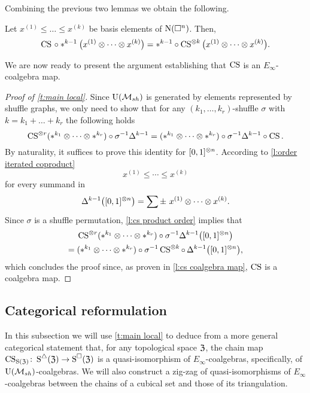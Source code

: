 Combining the previous two lemmas we obtain the following.

\begin{lemma} \label{l:cs product order}
	Let $x^{(1)} \leq \dots \leq x^{(k)}$ be basis elements of $\operatorname{N}(\square^n)$.
	Then,
	\[
	\operatorname{CS} \, \circ \ast^{k-1} \big( x^{(1)} \otimes \dotsb \otimes x^{(k)} \big)
	=
	\ast^{k-1} \circ \operatorname{CS}^{\otimes k} \big( x^{(1)} \otimes \dotsb \otimes x^{(k)} \big).
	\]
\end{lemma}

We are now ready to present the argument establishing that $\operatorname{CS}$ is an $E_\infty$-coalgebra map.

\begin{proof}[Proof of \cref{t:main local}]
	Since ${\operatorname{U}(\mathcal{M}_{sh})}$ is generated by elements represented by shuffle graphs, we only need to show that for any $(k_1,\dots,k_r)$-shuffle $\sigma$ with $k = k_1+\dots+k_r$ the following holds
	\[
	\operatorname{CS}^{\otimes r}(\ast^{k_1} \otimes \dotsb \otimes \ast^{k_r}) \circ \sigma^{-1} \Delta^{k-1} =
	(\ast^{k_1} \otimes \dotsb \otimes \ast^{k_r}) \circ \sigma^{-1} \Delta^{k-1} \circ \operatorname{CS}.
	\]
	By naturality, it suffices to prove this identity for $[0,1]^{\otimes n}$.
	According to \cref{l:order iterated coproduct}
	\[
	x^{(1)} \leq \cdots \leq x^{(k)}
	\]
	for every summand in
	\[
	\Delta^{k-1} \big([0,1]^{\otimes n}\big) =
	\sum \pm \ x^{(1)} \otimes \cdots \otimes x^{(k)}.
	\]
	Since $\sigma$ is a shuffle permutation, \cref{l:cs product order} implies that
	\begin{multline*}
		\operatorname{CS}^{\otimes r}(\ast^{k_1} \otimes \dotsb \otimes \ast^{k_r}) \circ \sigma^{-1} \Delta^{k-1} \big([0,1]^{\otimes n}\big) \\ =
		(\ast^{k_1} \otimes \dotsb \otimes \ast^{k_r}) \circ \sigma^{-1} \operatorname{CS}^{\otimes k} \circ \, \Delta^{k-1} \big([0,1]^{\otimes n}\big),
	\end{multline*}
	which concludes the proof since, as proven in \cref{l:cs coalgebra map}, $\operatorname{CS}$ is a coalgebra map.
\end{proof}

\subsection{Categorical reformulation}

In this subsection we will use \cref{t:main local} to deduce from a more general categorical statement that, for any topological space $\mathfrak{Z}$, the chain map $\operatorname{CS}_{\operatorname{S}(\mathfrak{Z})} \colon \operatorname{\operatorname{S}^{\triangle}}(\mathfrak{Z}) \to \operatorname{\operatorname{S}^{\square}}(\mathfrak{Z})$ is a quasi-isomorphism of $E_\infty$-coalgebras, specifically, of ${\operatorname{U}(\mathcal{M}_{sh})}$-coalgebras.
We will also construct a zig-zag of quasi-isomorphisms of $E_\infty$-coalgebras between the chains of a cubical set and those of its triangulation.


